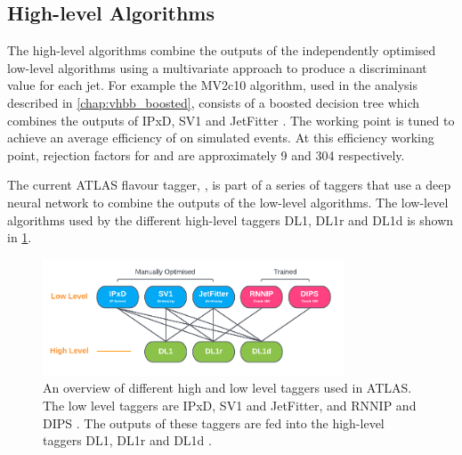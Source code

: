 \subsection{High-level Algorithms}\label{sec:high_level_algs}

The high-level algorithms combine the outputs of the independently optimised low-level algorithms using a multivariate approach to produce a discriminant value for each jet.
For example the MV2c10 algorithm, used in the analysis described in \cref{chap:vhbb_boosted}, consists of a boosted decision tree which combines the outputs of IPxD, SV1 and JetFitter \cite{ATL-PHYS-PUB-2015-022,FTAG-2018-01,ATL-PHYS-PUB-2017-013}.
The working point is tuned to achieve an average \bjet efficiency of  on simulated \ttbar events.
At this efficiency working point, rejection factors for \cjets and \ljets are approximately 9 and 304 respectively.

The current ATLAS flavour tagger, \DLr \cite{ATL-PHYS-PUB-2017-013}, is part of a series of taggers that use a deep neural network to combine the outputs of the low-level algorithms.
The low-level algorithms used by the different high-level taggers DL1, DL1r and DL1d is shown in \cref{fig:high_low_taggers}.



\begin{figure}[!htbp]
  \centering
  \includegraphics[width=0.8\textwidth]{chapters/3.tracking/figs/high_low_taggers.pdf}
  \caption{
    An overview of different high and low level taggers used in ATLAS.
    The low level taggers are IPxD, SV1 and JetFitter, and RNNIP and DIPS \cite{FTAG-2018-01,ATL-PHYS-PUB-2017-011,ATL-PHYS-PUB-2017-003,ATL-PHYS-PUB-2020-014}.
    The outputs of these taggers are fed into the high-level taggers DL1, DL1r and DL1d \cite{ATL-PHYS-PUB-2017-013,ATLAS:2022qxm}.
  }
  \label{fig:high_low_taggers}
\end{figure}